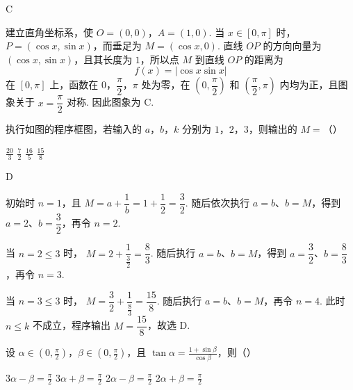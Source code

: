 \begin{answer}
C
\end{answer}

\begin{solution}
建立直角坐标系，使 \(O=(0,0)\)，\(A=(1,0)\). 当 \(x\in[0,\pi]\) 时，
\(P=(\cos x,\sin x)\)，而垂足为 \(M=(\cos x,0)\). 直线 \(OP\) 的方向向量为
\((\cos x,\sin x)\)，且其长度为 \(1\)，所以点 \(M\) 到直线 \(OP\) 的距离为
\[
f(x)=|\cos x\sin x|
\]
在 \([0,\pi]\) 上，函数在 \(0\)，\(\dfrac\pi2\)，\(\pi\) 处为零，在
\(\left(0,\dfrac\pi2\right)\) 和 \(\left(\dfrac\pi2,\pi\right)\) 内均为正，且图象关于
\(x=\dfrac\pi2\) 对称. 因此图象为 C.
\end{solution}

\begin{problem}
执行如图的程序框图，若输入的 \(a\)，\(b\)，\(k\) 分别为 \(1\)，\(2\)，\(3\)，则输出的 \(M =\)（\quad）


\choices
    {\(\frac{20}{3}\)}
    {\(\frac{7}{2}\)}
    {\(\frac{16}{5}\)}
    {\(\frac{15}{8}\)}
\end{problem}

\begin{answer}
D
\end{answer}

\begin{solution}
初始时 \(n=1\)，且
\(M=a+\dfrac1b=1+\dfrac12=\dfrac32\). 随后依次执行
\(a=b\)、\(b=M\)，得到 \(a=2\)、\(b=\dfrac32\)，再令 \(n=2\).

当 \(n=2\leqslant3\) 时，
\(M=2+\dfrac{1}{\frac{3}{2}}=\dfrac83\). 随后执行
\(a=b\)、\(b=M\)，得到 \(a=\dfrac32\)、\(b=\dfrac83\)，再令 \(n=3\).

当 \(n=3\leqslant3\) 时，
\(M=\dfrac32+\dfrac{1}{\frac{8}{3}}=\dfrac{15}{8}\). 随后执行
\(a=b\)、\(b=M\)，再令 \(n=4\). 此时 \(n\leqslant k\) 不成立，程序输出
\(M=\dfrac{15}{8}\)，故选 D.
\end{solution}

\begin{problem}
设 \(\alpha \in \left(0, \frac{\pi}{2}\right)\)，\(\beta \in \left(0, \frac{\pi}{2}\right)\)，且 \(\tan \alpha = \frac{1 + \sin \beta}{\cos \beta}\)，则（\quad）

\choices
    {\(3\alpha -\beta = \frac{\pi}{2}\)}
    {\(3\alpha +\beta = \frac{\pi}{2}\)}
    {\(2\alpha -\beta = \frac{\pi}{2}\)}
    {\(2\alpha +\beta = \frac{\pi}{2}\)}
\end{problem}

